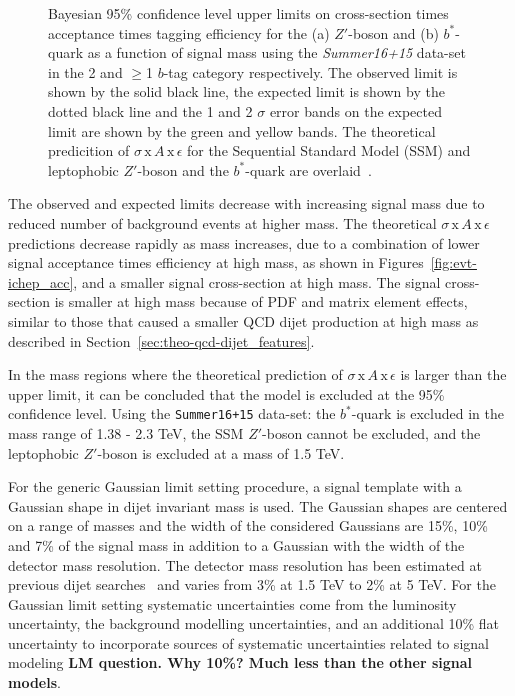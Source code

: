 \begin{figure}[!ht]
           {Bayesian 95\% confidence level upper limits on cross-section times acceptance times tagging efficiency
             for the (a) $Z'$-boson and (b) $b^*$-quark  as a function of signal mass
             using the \textit{Summer16+15} data-set in the 2 and $\geq$1 $b$-tag category respectively.
             The observed limit is shown by the solid black line,
             the expected limit is shown by the dotted black line
             and the 1 and 2 $\sigma$ error bands on the expected limit are shown by the green and yellow bands.
             The theoretical predicition of $\sigma\,\text{x}\,\mathit{A}\,\text{x}\,\epsilon$
             for the Sequential Standard Model (SSM) and leptophobic $Z'$-boson and the $b^*$-quark are overlaid~\cite{dibjet-ichep_conf}.
           }
  \label{fig:lim-summer_benchmark}
\end{figure}

The observed and expected limits decrease with increasing signal mass
due to reduced number of background events at higher mass.
The theoretical $\sigma\,\text{x}\,\mathit{A}\,\text{x}\,\epsilon$ predictions
decrease rapidly as mass increases, due to a combination of
lower signal acceptance times efficiency at high mass, as shown in Figures~\ref{fig:evt-ichep_acc},
and a smaller signal cross-section at high mass.
The signal cross-section is smaller at high mass because of PDF and matrix element effects,
similar to those that caused a smaller QCD dijet production at high mass as described in
 Section~\ref{sec:theo-qcd-dijet_features}.

In the mass regions where the theoretical prediction of $\sigma\,\text{x}\,\mathit{A}\,\text{x}\,\epsilon$
is larger than the upper limit, it can be concluded that the model is excluded at the 95\% confidence level.
Using the \verb|Summer16+15| data-set:
the \mbox{$b^*$-quark} is excluded in the mass range of 1.38 - 2.3 TeV,
the SSM $Z'$-boson cannot be excluded,
and the leptophobic $Z'$-boson is excluded at a mass of 1.5 TeV.

\FloatBarrier

For the generic Gaussian limit setting procedure,
a signal template with a Gaussian shape in dijet invariant mass is used.
The Gaussian shapes are centered on a range of masses
and the width of the considered Gaussians are
15\%, 10\% and 7\% of the signal mass
in addition to a Gaussian with the width of the detector mass resolution.
The detector mass resolution has been estimated
at previous dijet searches~\cite{dijet-mori16_paper}
and varies from 3\% at 1.5 TeV to 2\% at 5 TeV.
For the Gaussian limit setting
systematic uncertainties come from the luminosity uncertainty,
the background modelling uncertainties,
and an additional 10\% flat uncertainty to
incorporate sources of systematic uncertainties related to signal modeling
\textbf{LM question. Why 10\%? Much less than the other signal models}.

